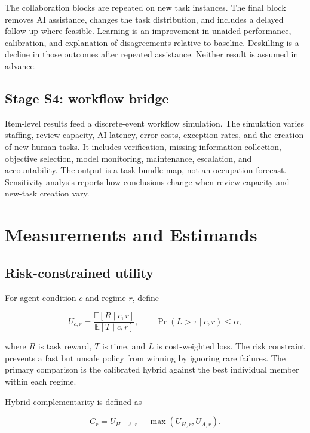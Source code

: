 \documentclass[conference]{IEEEtran}
\begin{document}
The collaboration blocks are repeated on new task instances. The final block removes AI assistance, changes the task distribution, and includes a delayed follow-up where feasible. Learning is an improvement in unaided performance, calibration, and explanation of disagreements relative to baseline. Deskilling is a decline in those outcomes after repeated assistance. Neither result is assumed in advance.

\subsection{Stage S4: workflow bridge}

Item-level results feed a discrete-event workflow simulation. The simulation varies staffing, review capacity, AI latency, error costs, exception rates, and the creation of new human tasks. It includes verification, missing-information collection, objective selection, model monitoring, maintenance, escalation, and accountability. The output is a task-bundle map, not an occupation forecast. Sensitivity analysis reports how conclusions change when review capacity and new-task creation vary.

\section{Measurements and Estimands}

\subsection{Risk-constrained utility}

For agent condition $c$ and regime $r$, define

\begin{equation}
U_{c,r}=\frac{\mathbb{E}[R\mid c,r]}{\mathbb{E}[T\mid c,r]},
\qquad \Pr(L>\tau\mid c,r)\leq\alpha,
\end{equation}

where $R$ is task reward, $T$ is time, and $L$ is cost-weighted loss. The risk constraint prevents a fast but unsafe policy from winning by ignoring rare failures. The primary comparison is the calibrated hybrid against the best individual member within each regime.

Hybrid complementarity is defined as

\begin{equation}
C_r=U_{H+A,r}-\max(U_{H,r},U_{A,r}).
\end{equation}
\end{document}
